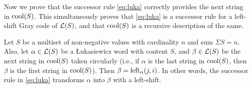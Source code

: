 Now we prove that the successor rule \eqref{eq:luka} correctly provides the next string in $\cool{S}$.
This simultaneously proves that \eqref{eq:luka} is a successor rule for a left-shift Gray code of $\Lukas{S}$, and that $\cool{S}$ is a recursive description of the same.

\begin{theorem}
\label{thm:equal}
Let $S$ be a multiset of non-negative values with cardinality $n$ and sum $\Sigma S = n$.
Also, let $\alpha \in \Lukas{S}$ be a Łukasiewicz word with content $S$, and $\beta \in \Lukas{S}$ be the next string in $\cool{S}$ taken circularly (i.e., if $\alpha$ is the last string in $\cool{S}$, then $\beta$ is the first string in $\cool{S}$).
Then $\beta = \lshiftindex[\alpha]{j}{i}$.
In other words, the successor rule in \eqref{eq:luka} transforms $\alpha$ into $\beta$ with a left-shift.
\end{theorem}
